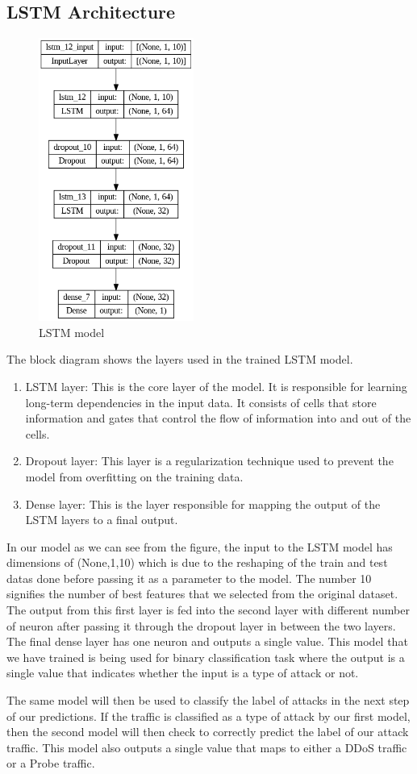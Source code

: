 \subsection{LSTM Architecture}
\vspace{-18pt}
\begin{figure}[tbh]
	\begin{center}
		\includegraphics[width=2in]{images/lstm_Model.png}
		\caption{LSTM model}
		\label{LSTM model}
	\end{center}
\end{figure}
\newpage
The block diagram shows the layers used in the trained LSTM model.
\begin{enumerate}[label=\roman*.]
	\item LSTM layer: This is the core layer of the model. It is responsible for learning long-term dependencies in the input data. It consists of cells that store information and gates that control the flow of information into and out of the cells.
	\item Dropout layer: This layer is a regularization technique used to prevent the model from overfitting on the training data.
	\item Dense layer: This is the layer responsible for mapping the output of the LSTM layers to a final output. 
\end{enumerate}
In our model as we can see from the figure, the input to the LSTM model has dimensions of (None,1,10) which is due to the reshaping of the train and test datas done before passing it as a parameter to the model. The number 10 signifies the number of best features that we selected from the original dataset. The output from this first layer is fed into the second layer with different number of neuron after passing it through the dropout layer in between the two layers. The final dense layer has one neuron and outputs a single value. This model that we have trained is being used for binary classification task where the output is a single value that indicates whether the input is a type of attack or not.\par 
The same model will then be used to classify the label of attacks in the next step of our predictions. If the traffic is classified as a type of attack by our first model, then the second model will then check to correctly predict the label of our attack traffic. This model also outputs a single value that maps to either a DDoS traffic or a Probe traffic.
